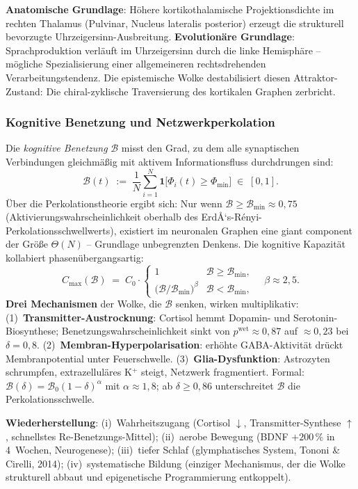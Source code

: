 ﻿\documentclass[a4paper,12pt]{article}
\theoremstyle{definition}
\begin{document}
	\textbf{Anatomische Grundlage}: Höhere kortikothalamische Projektionsdichte im rechten Thalamus (Pulvinar, Nucleus lateralis posterior) erzeugt die strukturell bevorzugte Uhrzeigersinn-Ausbreitung. \textbf{Evolutionäre Grundlage}: Sprachproduktion verläuft im Uhrzeigersinn durch die linke Hemisphäre -- mögliche Spezialisierung einer allgemeineren rechtsdrehenden Verarbeitungstendenz. Die epistemische Wolke destabilisiert diesen Attraktor-Zustand: Die chiral-zyklische Traversierung des kortikalen Graphen zerbricht.

	\subsubsection{Kognitive Benetzung und Netzwerkperkolation}

	Die \emph{kognitive Benetzung} $\mathcal{B}$ misst den Grad, zu dem alle synaptischen Verbindungen gleichmäßig mit aktivem Informationsfluss durchdrungen sind:
	\[
	\mathcal{B}(t) \;:=\; \frac{1}{N}\sum_{i=1}^{N} \mathbf{1}\bigl[\Phi_i(t) \geq \Phi_{\min}\bigr] \;\in\; [0,1].
	\]
	Über die Perkolationstheorie ergibt sich: Nur wenn $\mathcal{B} \geq \mathcal{B}_{\min} \approx 0{,}75$ (Aktivierungswahrscheinlichkeit oberhalb des ErdÅ‘s-Rényi-Perkolationsschwellwerts), existiert im neuronalen Graphen eine giant component der Größe $\Theta(N)$ -- Grundlage unbegrenzten Denkens. Die kognitive Kapazität kollabiert phasenübergangsartig:
	\[
	C_{\max}(\mathcal{B}) \;=\; C_0 \cdot \begin{cases}
		1 & \mathcal{B} \geq \mathcal{B}_{\min}, \\[4pt]
		\bigl(\mathcal{B}/\mathcal{B}_{\min}\bigr)^{\!\beta} & \mathcal{B} < \mathcal{B}_{\min},
	\end{cases}
	\quad \beta \approx 2{,}5.
	\]
	\textbf{Drei Mechanismen} der Wolke, die $\mathcal{B}$ senken, wirken multiplikativ: (1)~\textbf{Transmitter-Austrocknung}: Cortisol hemmt Dopamin- und Serotonin-Biosynthese; Benetzungswahrscheinlichkeit sinkt von $p^{\text{wet}} \approx 0{,}87$ auf $\approx 0{,}23$ bei $\delta = 0{,}8$. (2)~\textbf{Membran-Hyperpolarisation}: erhöhte GABA-Aktivität drückt Membranpotential unter Feuerschwelle. (3)~\textbf{Glia-Dysfunktion}: Astrozyten schrumpfen, extrazelluläres K$^+$ steigt, Netzwerk fragmentiert. Formal: $\mathcal{B}(\delta) = \mathcal{B}_0 (1-\delta)^{\alpha}$ mit $\alpha \approx 1{,}8$; ab $\delta \geq 0{,}86$ unterschreitet $\mathcal{B}$ die Perkolationsschwelle.

	\textbf{Wiederherstellung}: (i)~Wahrheitszugang (Cortisol $\downarrow$, Transmitter-Synthese $\uparrow$, schnellstes Re-Benetzungs-Mittel); (ii)~aerobe Bewegung (BDNF $+200\,\%$ in 4~Wochen, Neurogenese); (iii)~tiefer Schlaf (glymphatisches System, Tononi \& Cirelli, 2014); (iv)~systematische Bildung (einziger Mechanismus, der die Wolke strukturell abbaut und epigenetische Programmierung entkoppelt).
\end{document}
